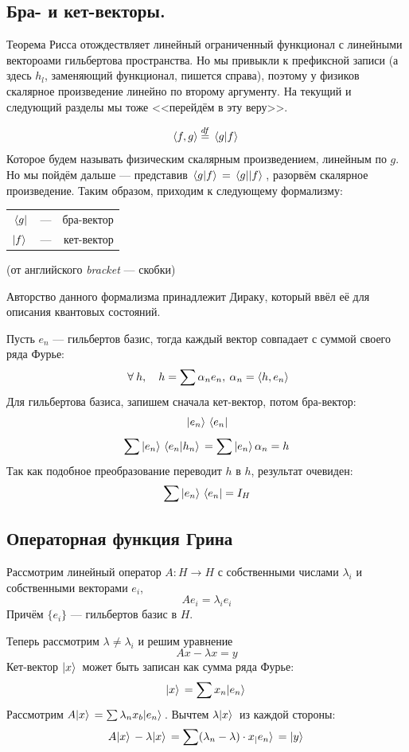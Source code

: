 \documentclass[12pt]{article}
\begin{document}
	\subsection{Бра- и кет-векторы.}
	Теорема Рисса отождествляет линейный ограниченный функционал с линейными вектороами гильбертова пространства.
	Но мы привыкли к префиксной записи (а здесь $h_l$, заменяющий функционал, пишется справа), поэтому у физиков
	скалярное произведение линейно по второму аргументу. На текущий и следующий разделы мы тоже <<перейдём в эту веру>>.
	
	$$\left\langle f, g \right\rangle \overset{df}{=} \, \langle g | f \rangle \,$$
	Которое будем называть физическим скалярным произведением, линейным по $g$. Но мы пойдём дальше --- представив
	$\, \langle g | f \rangle \, = \, \langle g | | f \rangle \,$, разорвём скалярное произведение. Таким образом, приходим к следующему формализму: \\
	\begin{tabular}{l c r}
		$\, \langle g |$ & --- & бра-вектор \\
		$| f \rangle \,$ & --- & кет-вектор \\
	\end{tabular}
	(от английского \textit{bracket} --- скобки)
	
	Авторство данного формализма принадлежит Дираку, который ввёл её для описания квантовых состояний.
	
	Пусть $e_n$ --- гильбертов базис, тогда каждый вектор совпадает с суммой своего ряда Фурье:
	$$ \forall h,\quad h = \sum \alpha_n e_n,\: \alpha_n = \scal{h}{e_n} $$
	Для гильбертова базиса, запишем сначала кет-вектор, потом бра-вектор:
	$$ | e_n \rangle \, \, \langle e_n | $$
	$$ \sum | e_n \rangle \, \, \langle e_n | h_n \rangle \, = \sum | e_n \rangle \, \alpha_n = h $$
	Так как подобное преобразование переводит $h$ в $h$, результат очевиден:
	$$ \sum | e_n \rangle \, \, \langle e_n | = I_H $$
	
	\subsection{Операторная функция Грина}
	
	Рассмотрим линейный оператор $A : H \rightarrow H$ с собственными числами $\lambda_i$ и собственными векторами $e_i$,
	$$A e_i = \lambda_i e_i$$
	Причём $\{e_i\}$ --- гильбертов базис в $H$.
	
	Теперь рассмотрим $\lambda \neq \lambda_i$ и решим уравнение
	$$ Ax - \lambda x = y $$
	Кет-вектор $| x \rangle \,$ может быть записан как сумма ряда Фурье:
	$$ | x \rangle \, = \sum x_n | e_n \rangle \, $$
	Рассмотрим $A | x \rangle \, = \sum \lambda_n x_b | e_n \rangle \,$. Вычтем $\lambda | x \rangle \,$ из каждой стороны:
	\begin{equation} \label{ketEq}
		A| x \rangle \, - \lambda| x \rangle \, = \sum (\lambda_n - \lambda) \cdot x_ | e_n \rangle \, = | y \rangle \,
	\end{equation}
	
\end{document}
